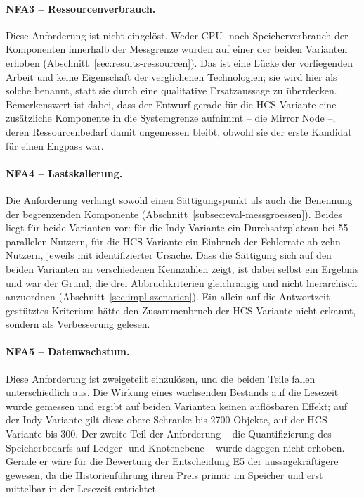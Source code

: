\paragraph{NFA3 -- Ressourcenverbrauch.} Diese Anforderung ist nicht eingelöst. Weder CPU- noch Speicherverbrauch der Komponenten innerhalb der Messgrenze wurden auf einer der beiden Varianten erhoben (Abschnitt~\ref{sec:results-ressourcen}). Das ist eine Lücke der vorliegenden Arbeit und keine Eigenschaft der verglichenen Technologien; sie wird hier als solche benannt, statt sie durch eine qualitative Ersatzaussage zu überdecken. Bemerkenswert ist dabei, dass der Entwurf gerade für die HCS-Variante eine zusätzliche Komponente in die Systemgrenze aufnimmt -- die Mirror Node --, deren Ressourcenbedarf damit ungemessen bleibt, obwohl sie der erste Kandidat für einen Engpass war.

\paragraph{NFA4 -- Lastskalierung.} Die Anforderung verlangt sowohl einen Sättigungspunkt als auch die Benennung der begrenzenden Komponente (Abschnitt~\ref{subsec:eval-messgroessen}). Beides liegt für beide Varianten vor: für die Indy-Variante ein Durchsatzplateau bei 55 parallelen Nutzern, für die HCS-Variante ein Einbruch der Fehlerrate ab zehn Nutzern, jeweils mit identifizierter Ursache. Dass die Sättigung sich auf den beiden Varianten an verschiedenen Kennzahlen zeigt, ist dabei selbst ein Ergebnis und war der Grund, die drei Abbruchkriterien gleichrangig und nicht hierarchisch anzuordnen (Abschnitt~\ref{sec:impl-szenarien}). Ein allein auf die Antwortzeit gestütztes Kriterium hätte den Zusammenbruch der HCS-Variante nicht erkannt, sondern als Verbesserung gelesen.

\paragraph{NFA5 -- Datenwachstum.} Diese Anforderung ist zweigeteilt einzulösen, und die beiden Teile fallen unterschiedlich aus. Die Wirkung eines wachsenden Bestands auf die Lesezeit wurde gemessen und ergibt auf beiden Varianten keinen auflösbaren Effekt; auf der Indy-Variante gilt diese obere Schranke bis 2700 Objekte, auf der HCS-Variante bis 300. Der zweite Teil der Anforderung -- die Quantifizierung des Speicherbedarfs auf Ledger- und Knotenebene -- wurde dagegen nicht erhoben. Gerade er wäre für die Bewertung der Entscheidung E5 der aussagekräftigere gewesen, da die Historienführung ihren Preis primär im Speicher und erst mittelbar in der Lesezeit entrichtet.

